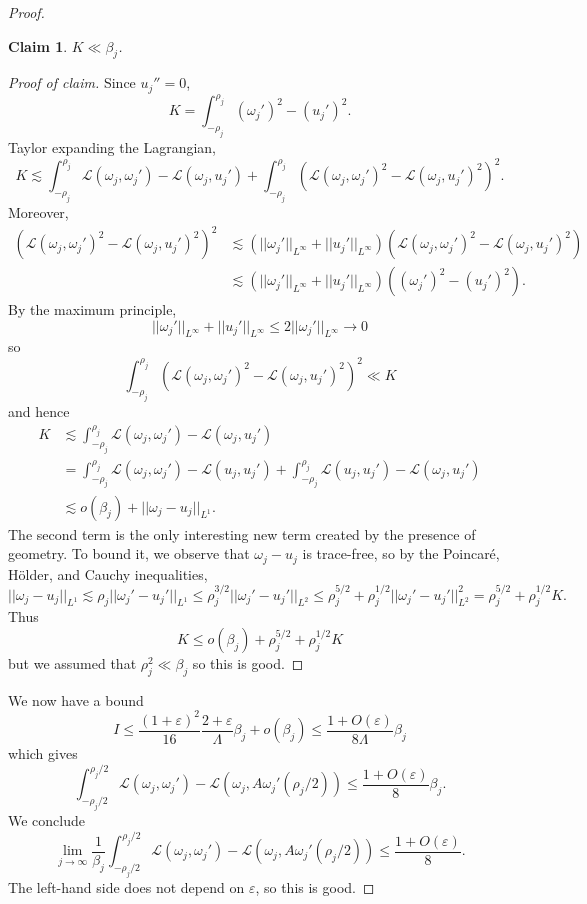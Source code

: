 \documentclass[reqno,12pt,letterpaper]{amsart}
\newcommand{\Lagrange}{\mathscr L}
\newtheorem{claim}[theorem]{Claim}
\theoremstyle{definition}
\numberwithin{equation}{section}
\begin{document}
\begin{proof}
\begin{claim}
$K \ll \beta_j$.
\end{claim}
\begin{proof}[Proof of claim]
Since $u_j'' = 0$,
$$K = \int_{-\rho_j}^{\rho_j} (\omega_j')^2 - (u_j')^2.$$
Taylor expanding the Lagrangian,
$$K \lesssim \int_{-\rho_j}^{\rho_j} \Lagrange(\omega_j, \omega_j') - \Lagrange(\omega_j, u_j') + \int_{-\rho_j}^{\rho_j} (\Lagrange(\omega_j, \omega_j')^2 - \Lagrange(\omega_j, u_j')^2)^2.$$
Moreover,
\begin{align*}
(\Lagrange(\omega_j, \omega_j')^2 - \Lagrange(\omega_j, u_j')^2)^2 &\lesssim (||\omega_j'||_{L^\infty} + ||u_j'||_{L^\infty}) (\Lagrange(\omega_j, \omega_j')^2 - \Lagrange(\omega_j, u_j')^2)\\
& \lesssim (||\omega_j'||_{L^\infty} + ||u_j'||_{L^\infty}) ((\omega_j')^2 - (u_j')^2).
\end{align*}
By the maximum principle,
$$||\omega_j'||_{L^\infty} + ||u_j'||_{L^\infty} \leq 2||\omega_j'||_{L^\infty} \to 0$$
so
$$\int_{-\rho_j}^{\rho_j} (\Lagrange(\omega_j, \omega_j')^2 - \Lagrange(\omega_j, u_j')^2)^2 \ll K$$
and hence
\begin{align*}
K &\lesssim \int_{-\rho_j}^{\rho_j} \Lagrange(\omega_j, \omega_j') - \Lagrange(\omega_j, u_j')\\
&= \int_{-\rho_j}^{\rho_j} \mathscr L(\omega_j, \omega_j') - \mathscr L(u_j, u_j') + \int_{-\rho_j}^{\rho_j }\mathscr L(u_j, u_j') - \mathscr L(\omega_j, u_j')\\
&\lesssim o(\beta_j) + ||\omega_j - u_j||_{L^1}.
\end{align*}
The second term is the only interesting new term created by the presence of geometry.
To bound it, we observe that $\omega_j - u_j$ is trace-free, so by the Poincar\'e, H\"older, and Cauchy inequalities,
$$||\omega_j - u_j||_{L^1} \lesssim \rho_j ||\omega_j' - u_j'||_{L^1} \leq \rho^{3/2}_j ||\omega_j' - u_j'||_{L^2} \leq \rho^{5/2}_j + \rho^{1/2}_j ||\omega_j' - u_j'||_{L^2}^2 = \rho^{5/2}_j + \rho^{1/2}_j K.$$
Thus
$$K \leq o(\beta_j) + \rho^{5/2}_j + \rho^{1/2}_j K$$
but we assumed that $\rho^2_j \ll \beta_j$ so this is good.
\end{proof}

We now have a bound
$$I \leq \frac{(1 + \varepsilon)^2}{16} \frac{2 + \varepsilon}{\Lambda} \beta_j + o(\beta_j) \leq \frac{1 + O(\varepsilon)}{8\Lambda} \beta_j$$
which gives
$$\int_{-\rho_j/2}^{\rho_j/2} \Lagrange(\omega_j, \omega_j') - \Lagrange(\omega_j, A \omega_j'(\rho_j/2)) \leq \frac{1 + O(\varepsilon)}{8} \beta_j.$$
We conclude
$$\lim_{j \to \infty} \frac{1}{\beta_j} \int_{-\rho_j/2}^{\rho_j/2} \Lagrange(\omega_j, \omega_j') - \Lagrange(\omega_j, A \omega_j'(\rho_j/2)) \leq \frac{1 + O(\varepsilon)}{8}.$$
The left-hand side does not depend on $\varepsilon$, so this is good.
\end{proof}
\end{document}
